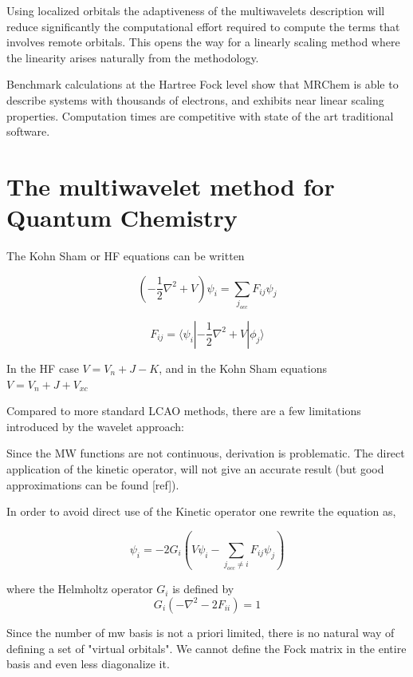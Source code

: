 \documentclass{article}
\begin{document}
Using localized orbitals the adaptiveness of the multiwavelets description will reduce significantly the computational effort required to compute the terms that involves remote orbitals. This opens the way for a linearly scaling method where the linearity arises naturally from the methodology.


Benchmark calculations at the Hartree Fock level show that MRChem is able to describe systems with thousands of electrons, and exhibits near linear scaling properties. Computation times are competitive with state of the art traditional software.


\section{The multiwavelet method for Quantum Chemistry}


The Kohn Sham or HF equations can be written

\begin{equation}
  (-\frac{1}{2}\nabla^2 + V) \psi_i = \sum_{j_{occ}} F_{ij} \psi_j
\end{equation}

\begin{equation}
  F_{ij} = \langle \psi_i |{-\frac{1}{2}\nabla^2+V}| {\phi_j}\rangle
\end{equation}

In the HF case $V=V_n+J-K$, and in the Kohn Sham equations $V=V_n+J+V_{xc}$

Compared to more standard LCAO methods, there are a few limitations introduced by the wavelet approach:

Since the  MW functions are not continuous, derivation is problematic. The direct application of the kinetic operator, will not give an accurate result (but good approximations can be found [ref]).

In order to avoid direct use of the Kinetic operator one rewrite the equation as, 

\begin{equation}
\psi_i = -2 G_{i}(V\psi_i - \sum_{j_{occ} \ne i} F_{ij} \psi_j)
\end{equation}

where the Helmholtz operator $G_{i}$ is defined by
\begin{equation}
G_{i}(-\nabla^2 - 2 F_{ii} )=1
\end{equation}

Since the number of mw basis is not a priori limited, there is no natural way of defining a set of "virtual orbitals". We cannot define the Fock matrix in the entire basis and even less diagonalize it.
\end{document}
